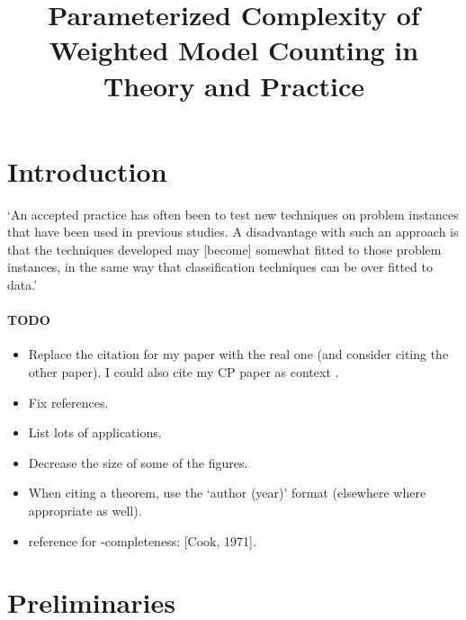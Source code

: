 \documentclass{article}
\title{Parameterized Complexity of Weighted Model Counting in Theory and
  Practice}
\theoremstyle{definition}
\theoremstyle{remark}
\begin{document}
\maketitle

\section{Introduction}

`An accepted practice has often been to test new techniques on problem instances
that have been used in previous studies. A disadvantage with such an approach is
that the techniques developed may [become] somewhat fitted to those problem
instances, in the same way that classification techniques can be over fitted to
data.'

\paragraph{TODO}
\begin{itemize}
\item Replace the citation for my paper with the real one (and consider citing
  the other paper). I could also cite my CP paper as context
  \cite{DBLP:conf/cp/DilkasB20}.
\item Fix references.
\item List lots of applications.
\item Decrease the size of some of the figures.
\item When citing a theorem, use the `author (year)' format (elsewhere where
  appropriate as well).
\item reference for \NP{}-completeness: [Cook, 1971].
\end{itemize}

\section{Preliminaries}
\end{document}
